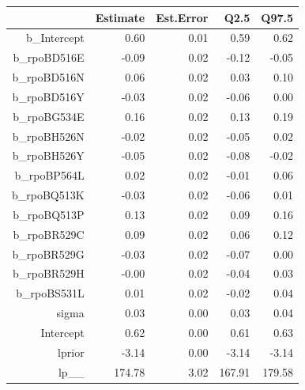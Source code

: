 \begin{table}[ht]
\centering
\begin{tabular}{rrrrr}
  \hline
 & Estimate & Est.Error & Q2.5 & Q97.5 \\ 
  \hline
b\_Intercept & 0.60 & 0.01 & 0.59 & 0.62 \\ 
  b\_rpoBD516E & -0.09 & 0.02 & -0.12 & -0.05 \\ 
  b\_rpoBD516N & 0.06 & 0.02 & 0.03 & 0.10 \\ 
  b\_rpoBD516Y & -0.03 & 0.02 & -0.06 & 0.00 \\ 
  b\_rpoBG534E & 0.16 & 0.02 & 0.13 & 0.19 \\ 
  b\_rpoBH526N & -0.02 & 0.02 & -0.05 & 0.02 \\ 
  b\_rpoBH526Y & -0.05 & 0.02 & -0.08 & -0.02 \\ 
  b\_rpoBP564L & 0.02 & 0.02 & -0.01 & 0.06 \\ 
  b\_rpoBQ513K & -0.03 & 0.02 & -0.06 & 0.01 \\ 
  b\_rpoBQ513P & 0.13 & 0.02 & 0.09 & 0.16 \\ 
  b\_rpoBR529C & 0.09 & 0.02 & 0.06 & 0.12 \\ 
  b\_rpoBR529G & -0.03 & 0.02 & -0.07 & 0.00 \\ 
  b\_rpoBR529H & -0.00 & 0.02 & -0.04 & 0.03 \\ 
  b\_rpoBS531L & 0.01 & 0.02 & -0.02 & 0.04 \\ 
  sigma & 0.03 & 0.00 & 0.03 & 0.04 \\ 
  Intercept & 0.62 & 0.00 & 0.61 & 0.63 \\ 
  lprior & -3.14 & 0.00 & -3.14 & -3.14 \\ 
  lp\_\_ & 174.78 & 3.02 & 167.91 & 179.58 \\ 
   \hline
\end{tabular}
\end{table}
